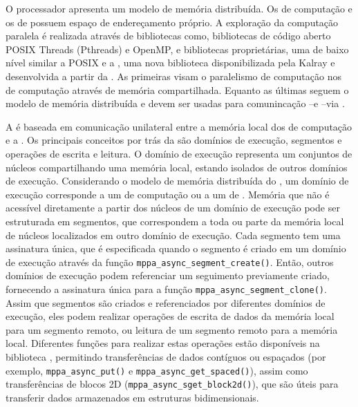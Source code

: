 O processador apresenta um modelo de memória distribuída. Os \clusters de computação e os \clusters de \io possuem espaço de endereçamento próprio. A exploração da computação paralela 
é realizada através de bibliotecas como, bibliotecas de código aberto POSIX Threads (Pthreads) e OpenMP, e bibliotecas proprietárias, uma de baixo nível similar a POSIX \ipc e a \async, uma nova biblioteca disponibilizada pela Kalray e desenvolvida a partir da \ipc. As primeiras visam o paralelismo de computação nos \clusters de computação através de memória compartilhada. Equanto as últimas seguem o modelo de memória distribuída e devem ser usadas para comunincação \cluster--\cluster e \cluster--\io via \noc.

A \async é baseada em comunicação unilateral entre a memória local dos \clusters de computação e a \lpddr. Os principais conceitos por trás da \async são domínios de execução, segmentos e operações de escrita e leitura. O domínio de execução representa um conjuntos de núcleos compartilhando uma memória local, estando isolados de outros domínios de execução. Considerando o modelo de memória distribuída do \mppa, um domínio de execução corresponde a um \cluster de computação ou a um \cluster de \io. Memória que não é acessível diretamente a partir dos núcleos de um domínio de execução pode ser estruturada em segmentos, que correspondem a toda ou parte da memória local de núcleos localizados em outro domínio de execução. Cada segmento tem uma assinatura única, que é especificada quando o segmento é criado em um domínio de execução através da função \texttt{mppa\_async\_segment\_create()}. Então, outros domínios de execução podem referenciar um seguimento previamente criado, fornecendo a assinatura única para a função \texttt{mppa\_async\_segment\_clone()}. Assim que segmentos são criados e referenciados por diferentes domínios de execução, eles podem realizar operações de escrita de dados da memória local para um segmento remoto, ou leitura de um segmento remoto para a memória local.
Diferentes funções para realizar estas operações estão disponíveis na biblioteca \async, permitindo transferências de dados contíguos ou espaçados (por exemplo, \texttt{mppa\_async\_put()} e \texttt{mppa\_async\_get\_spaced()}), assim como transferências de blocos 2D (\texttt{mppa\_async\_sget\_block2d()}), que são úteis para transferir dados armazenados em estruturas bidimensionais.

